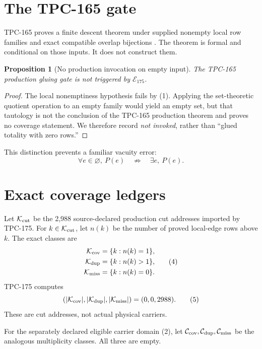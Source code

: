 \documentclass[11pt]{article}
\newtheorem{proposition}[theorem]{Proposition}
\theoremstyle{definition}
\theoremstyle{remark}
\begin{document}
\section{The TPC-165 gate}

TPC-165 proves a finite descent theorem under supplied nonempty local
row families and exact compatible overlap bijections
\cite{WangTPC165}.  The theorem is formal and conditional on those
inputs.  It does not construct them.

\begin{proposition}[No production invocation on empty input]
The TPC-165 production gluing gate is not triggered by
\(\mathcal E_{175}\).
\end{proposition}

\begin{proof}
The local nonemptiness hypothesis fails by (1).  Applying the
set-theoretic quotient operation to an empty family would yield an
empty set, but that tautology is not the conclusion of the TPC-165
production theorem and proves no coverage statement.  We therefore
record \emph{not invoked}, rather than ``glued totality with zero
rows.''
\end{proof}

This distinction prevents a familiar vacuity error:
\[
  \forall e\in\varnothing,\ P(e)
  \quad\not\Rightarrow\quad
  \exists e,\ P(e).                                                \tag{3}
\]

\section{Exact coverage ledgers}

Let \(\mathcal K_{\rm cut}\) be the 2,988 source-declared production
cut addresses imported by TPC-175.  For \(k\in\mathcal K_{\rm cut}\),
let \(n(k)\) be the number of proved local-edge rows above \(k\).  The
exact classes are
\[
\begin{aligned}
 \mathcal K_{\rm cov}&=\{k:n(k)=1\},\\
 \mathcal K_{\rm dup}&=\{k:n(k)>1\},\\
 \mathcal K_{\rm miss}&=\{k:n(k)=0\}.
\end{aligned}                                                     \tag{4}
\]
TPC-175 computes
\[
 (|\mathcal K_{\rm cov}|,|\mathcal K_{\rm dup}|,
   |\mathcal K_{\rm miss}|)=(0,0,2988).                           \tag{5}
\]
These are cut addresses, not actual physical carriers.

For the separately declared eligible carrier domain (2), let
\(\mathcal C_{\rm cov},\mathcal C_{\rm dup},\mathcal C_{\rm miss}\)
be the analogous multiplicity classes.  All three are empty.
\end{document}
